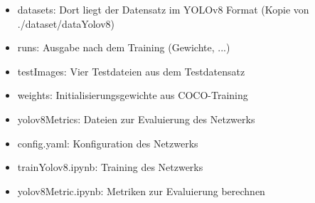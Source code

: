 \begin{itemize}
	\item datasets: Dort liegt der Datensatz im YOLOv8 Format (Kopie von ./dataset/dataYolov8)
	\item runs: Ausgabe nach dem Training (Gewichte, ...)
	\item testImages: Vier Testdateien aus dem Testdatensatz
	\item weights: Initialisierungsgewichte aus COCO-Training
	\item yolov8Metrics: Dateien zur Evaluierung des Netzwerks
	\item config.yaml:  Konfiguration des Netzwerks
	\item trainYolov8.ipynb: Training des Netzwerks
	\item yolov8Metric.ipynb: Metriken zur Evaluierung berechnen
\end{itemize}